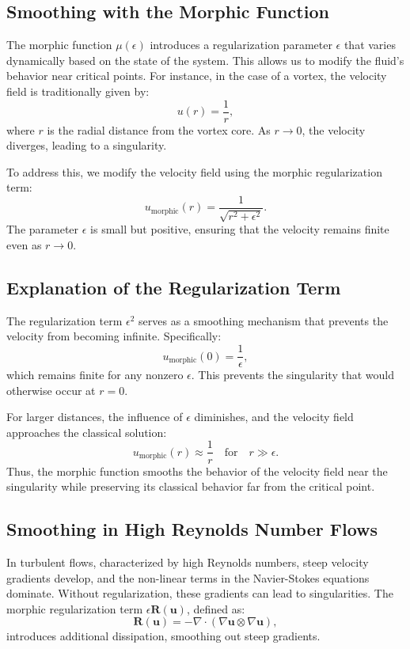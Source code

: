 \documentclass{article}
\begin{document}
\subsection*{Smoothing with the Morphic Function}

The morphic function \( \mu(\epsilon) \) introduces a regularization parameter \( \epsilon \) that varies dynamically based on the state of the system. This allows us to modify the fluid's behavior near critical points. For instance, in the case of a vortex, the velocity field is traditionally given by:
\[
u(r) = \frac{1}{r},
\]
where \( r \) is the radial distance from the vortex core. As \( r \to 0 \), the velocity diverges, leading to a singularity.

To address this, we modify the velocity field using the morphic regularization term:
\[
u_{\text{morphic}}(r) = \frac{1}{\sqrt{r^2 + \epsilon^2}}.
\]
The parameter \( \epsilon \) is small but positive, ensuring that the velocity remains finite even as \( r \to 0 \). 

\subsection*{Explanation of the Regularization Term}

The regularization term \( \epsilon^2 \) serves as a smoothing mechanism that prevents the velocity from becoming infinite. Specifically:
\[
u_{\text{morphic}}(0) = \frac{1}{\epsilon},
\]
which remains finite for any nonzero \( \epsilon \). This prevents the singularity that would otherwise occur at \( r = 0 \).

For larger distances, the influence of \( \epsilon \) diminishes, and the velocity field approaches the classical solution:
\[
u_{\text{morphic}}(r) \approx \frac{1}{r} \quad \text{for} \quad r \gg \epsilon.
\]
Thus, the morphic function smooths the behavior of the velocity field near the singularity while preserving its classical behavior far from the critical point.

\subsection*{Smoothing in High Reynolds Number Flows}

In turbulent flows, characterized by high Reynolds numbers, steep velocity gradients develop, and the non-linear terms in the Navier-Stokes equations dominate. Without regularization, these gradients can lead to singularities. The morphic regularization term \( \epsilon \mathbf{R}(\mathbf{u}) \), defined as:
\[
\mathbf{R}(\mathbf{u}) = - \nabla \cdot (\nabla \mathbf{u} \otimes \nabla \mathbf{u}),
\]
introduces additional dissipation, smoothing out steep gradients.
\end{document}
